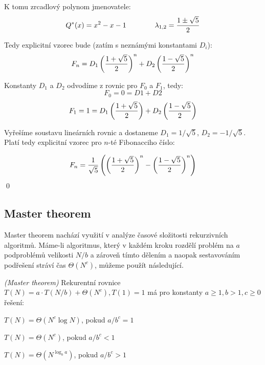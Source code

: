 K tomu zrcadlový polynom jmenovatele:
$$Q^*(x) = x^2-x-1\qquad\qquad\lambda_{1,2} = {1\pm\sqrt 5\over 2}$$

Tedy explicitní vzorec bude (zatím s neznámými konstantami $D_i$):
$$F_n = D_1\left({1+\sqrt 5\over 2}\right)^n + D_2\left({1-\sqrt 5\over 2}\right)^n$$

Konstanty $D_1$ a $D_2$ odvodíme z rovnic pro $F_0$ a $F_1$, tedy:
$$F_0 = 0 = D1 + D2$$
$$F_1 = 1 = D_1\left({1+\sqrt 5\over 2}\right) + D_2\left({1-\sqrt 5\over 2}\right)$$

Vyřešíme soustavu lineárních rovnic a dostaneme $D_1 = 1/\sqrt 5$, $D_2 = -1/\sqrt 5$. Platí tedy explicitní vzorec pro $n$-té Fibonacciho číslo:

$$F_n = {1\over\sqrt 5}\left(\left({1+\sqrt 5\over 2}\right)^n - \left({1-\sqrt 5\over 2}\right)^n\right)$$
\qed

\subsection{Master theorem}

Master theorem nachází využití v analýze časové složitosti rekurzivních
algoritmů. Máme-li algoritmus, který v každém kroku rozdělí problém na $a$
podproblémů velikosti $N/b$ a zároveň tímto dělením a naopak sestavováním
podřešení stráví čas $\Theta(N^c)$, můžeme použít následující.

\vt \emph{(Master theorem)} Rekurentní rovnice $T(N) = a\cdot T(N/b) + \Theta(N^c), T(1) = 1$ má pro konstanty $a \ge 1, b > 1, c\ge 0$ řešení:
\begin{itemize*}
\item $T(N) = \Theta(N^c \log N)$, pokud $a/b^c = 1$
\item $T(N) = \Theta(N^c)$, pokud $a/b^c < 1$
\item $T(N) = \Theta(N^{\log_b a})$, pokud $a/b^c > 1$
\end{itemize*}

\todo \dk

